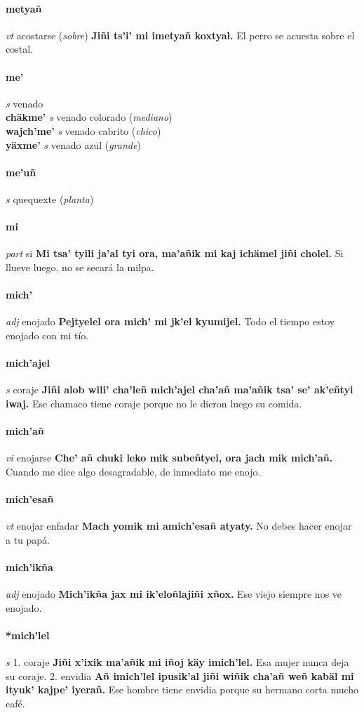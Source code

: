 \documentclass{scrbook}
\newcommand{\entry}[1]{\paragraph{#1}}
\newcommand{\onedefinition}[1]{#1.}
\newcommand{\partofspeech}[1]{\textit{#1}}
\newcommand{\spanishtranslation}[1]{#1}
\newcommand{\clarification}[1]{(\textit{#1})}
\newcommand{\cholexample}[1]{\textbf{#1}}
\newcommand{\exampletranslation}[1]{#1}
\newcommand{\secondaryentry}[1]{\\\textbf{#1}}
\newcommand{\secondpartofspeech}[1]{\textit{#1}}
\newcommand{\secondtranslation}[1]{#1}
\begin{document}
\begin{multicols}{2}
\entry{metyañ}
\partofspeech{vt}
\spanishtranslation{acostarse}
\clarification{sobre}
\cholexample{Jiñi ts'i' mi imetyañ koxtyal.}
\exampletranslation{El perro se acuesta sobre el costal.}

\entry{me'}
\partofspeech{s}
\spanishtranslation{venado}
\secondaryentry{chäkme'}
\secondpartofspeech{s}
\secondtranslation{venado colorado}
\clarification{mediano}
\secondaryentry{wajch'me'}
\secondpartofspeech{s}
\secondtranslation{venado cabrito}
\clarification{chico}
\secondaryentry{yäxme'}
\secondpartofspeech{s}
\secondtranslation{venado azul}
\clarification{grande}

\entry{me'uñ}
\partofspeech{s}
\spanishtranslation{quequexte}
\clarification{planta}

\entry{mi}
\partofspeech{part}
\spanishtranslation{si}
\cholexample{Mi tsa' tyili ja'al tyi ora, ma'añik mi kaj ichämel jiñi cholel.}
\exampletranslation{Si llueve luego, no se secará la milpa.}

\entry{mich'}
\partofspeech{adj}
\spanishtranslation{enojado}
\cholexample{Pejtyelel ora mich' mi jk'el kyumijel.}
\exampletranslation{Todo el tiempo estoy enojado con mi tío.}

\entry{mich'ajel}
\partofspeech{s}
\spanishtranslation{coraje}
\cholexample{Jiñi alob wili' cha'leñ mich'ajel cha'añ ma'añik tsa' se' ak'eñtyi iwaj.}
\exampletranslation{Ese chamaco tiene coraje porque no le dieron luego su comida.}

\entry{mich'añ}
\partofspeech{vi}
\spanishtranslation{enojarse}
\cholexample{Che' añ chuki leko mik subeñtyel, ora jach mik mich'añ.}
\exampletranslation{Cuando me dice algo desagradable, de inmediato me enojo.}

\entry{mich'esañ}
\partofspeech{vt}
\spanishtranslation{enojar}
\spanishtranslation{enfadar}
\cholexample{Mach yomik mi amich'esañ atyaty.}
\exampletranslation{No debes hacer enojar a tu papá.}

\entry{mich'ikña}
\partofspeech{adj}
\spanishtranslation{enojado}
\cholexample{Mich'ikña jax mi ik'eloñlajiñi xñox.}
\exampletranslation{Ese viejo siempre nos ve enojado.}

\entry{*mich'lel}
\partofspeech{s}
\onedefinition{1}
\spanishtranslation{coraje}
\cholexample{Jiñi x'ixik ma'añik mi iñoj käy imich'lel.}
\exampletranslation{Esa mujer nunca deja su coraje.}
\onedefinition{2}
\spanishtranslation{envidia}
\cholexample{Añ imich'lel ipusik'al jiñi wiñik cha'añ weñ kabäl mi ityuk' kajpe' iyerañ.}
\exampletranslation{Ese hombre tiene envidia porque su hermano corta mucho café.}


\end{multicols}
\end{document}
